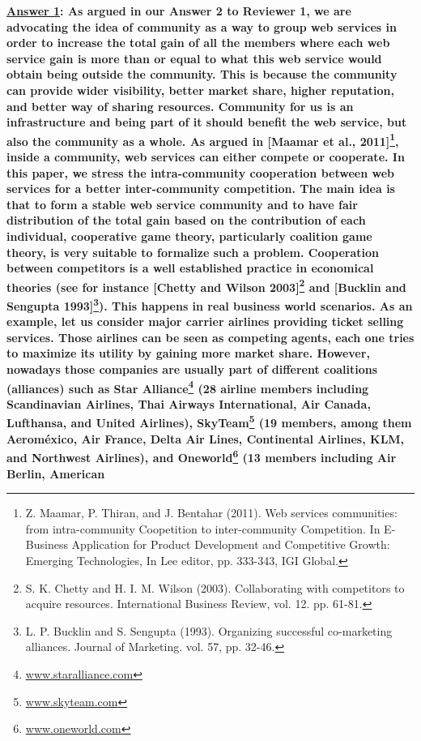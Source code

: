 \documentclass[times, 12pt,a4paper]{article}
\begin{document}
\vspace{0.2cm}\textbf{\underline{Answer 1}: As argued in our
Answer 2 to Reviewer 1, we are advocating the idea of community as
a way to group web services in order to increase the total gain of
all the members where each web service gain is more than or equal
to what this web service would obtain being outside the community.
This is because the community can provide wider visibility, better
market share, higher reputation, and better way of sharing
resources. Community for us is an infrastructure and being part of
it should benefit the web service, but also the community as a
whole. As argued in [Maamar et al., 2011]\footnote{Z. Maamar, P.
Thiran, and J. Bentahar (2011). Web services communities: from
intra-community Coopetition to inter-community Competition. In
E-Business Application for Product Development and Competitive
Growth: Emerging Technologies, In Lee editor, pp. 333-343, IGI
Global.}, inside a community, web services can either compete or
cooperate. In this paper, we stress the intra-community
cooperation between web services for a better inter-community
competition. The main idea is that to form a stable web service
community and to have fair distribution of the total gain based on
the contribution of each individual, cooperative game theory,
particularly coalition game theory, is very suitable to formalize
such a problem. Cooperation between competitors is a well
established practice in economical theories (see for instance
[Chetty and Wilson 2003]\footnote{S. K. Chetty and H. I. M. Wilson
(2003). Collaborating with competitors to acquire resources.
International Business Review, vol. 12. pp. 61-81.} and [Bucklin
and Sengupta 1993]\footnote{L. P. Bucklin and S. Sengupta (1993).
Organizing successful co-marketing alliances. Journal of
Marketing. vol. 57, pp. 32-46.}). This happens in real business
world scenarios. As an example, let us consider major carrier
airlines providing ticket selling services. Those airlines can be
seen as competing agents, each one tries to maximize its utility
by gaining more market share. However, nowadays those companies
are usually part of different coalitions (alliances) such as Star
Alliance\footnote{\url{www.staralliance.com}} (28 airline members
including Scandinavian Airlines, Thai Airways International, Air
Canada, Lufthansa, and United Airlines),
SkyTeam\footnote{\url{www.skyteam.com}} (19 members, among them
Aerom\'{e}xico, Air France, Delta Air Lines, Continental Airlines,
KLM, and Northwest Airlines), and Oneworld\footnote{\url{
www.oneworld.com}} (13 members including Air Berlin, American
}
\end{document}
